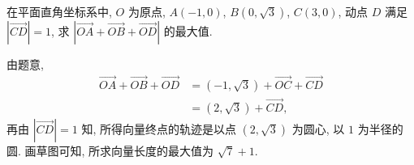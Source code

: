\begin{exercise}
    在平面直角坐标系中, $O$ 为原点, $A(-1,0)$, $B(0,\sqrt3)$, $C(3,0)$, 
    动点 $D$ 满足 $|\overrightarrow{CD}|=1$, 求 $|\overrightarrow{OA}
      + \overrightarrow{OB}+ \overrightarrow{OD}|$ 的最大值.
\end{exercise}
\beginsolution
    由题意,
    \[\begin{aligned}
        \overrightarrow{OA}+ \overrightarrow{OB}+ \overrightarrow{OD}
        &= (-1,\sqrt3)+ \overrightarrow{OC}+ \overrightarrow{CD}\\
        &= (2,\sqrt3)+ \overrightarrow{CD},
    \end{aligned}\]
    再由 $|\overrightarrow{CD}|=1$ 知, 所得向量终点的轨迹是以点 $(2,\sqrt3)$ 为圆心, 以 $1$ 为半径的圆. 画草图可知, 所求向量长度的最大值为 $\sqrt7+1$.
\endsolution